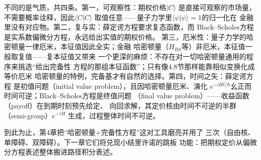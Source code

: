 不同的是气质，共四条。第一，可观察性：期权价格$\vert C\rangle$
是直接可观察的市场量，不需要概率诠释，因此$\langle C\vert C\rangle$
取值任意——量子力学里$\langle\psi\vert\psi\rangle=1$的归一化在
金融里没有对应物。第二，复与实：薛定谔方程要求复态函数，而
Black--Scholes方程是实系数偏微分方程，永远给出实值的期权价格。
第三，厄米性：量子力学的哈密顿量一律厄米，本征值因此全实；金融
哈密顿量（$H_{BS}$等）非厄米，本征值一般取复值——复本征值又带来
一个更深的麻烦：不存在对一切哈密顿量通用的程序来挑选“给出完备性
方程的那组本征函数”；只有像4.8节那样能靠相似变换化成等价厄米
哈密顿量的特例，完备基才有自然的选择。第四，时间之矢：薛定谔方程
是初值问题（initial value problem），且因哈密顿量厄米、演化
$e^{-iHt/\hbar}$幺正而时间可逆；Black--Scholes方程是终值问题
（final value problem）——收益函数（payoff）在到期时刻预先给定、
向回求解，其定价核由时间不可逆的半群（semi-group）$e^{-\tau H}$
生成，过程整体时间不可逆。

到此为止，第4章把“哈密顿量$+$完备性方程”这对工具磨亮并用了
三次（自由核、单障碍、双障碍）。下一章它们将兑现小结里许诺的跳板
功能：把期权定价从偏微分方程表述整体搬进路径积分表述。

